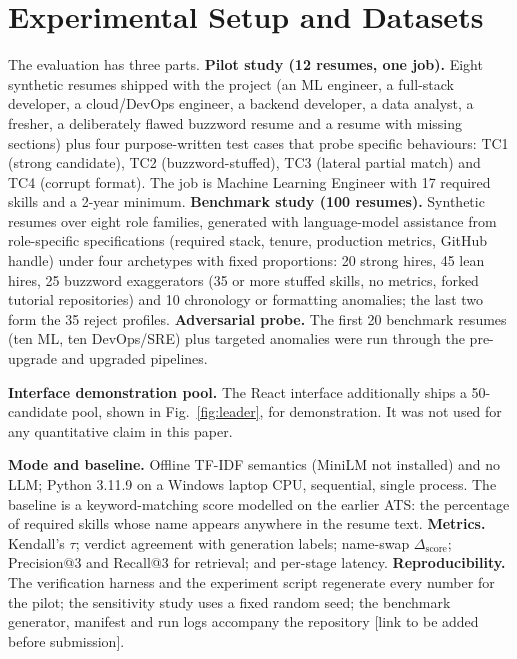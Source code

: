 \documentclass[conference]{IEEEtran}
\begin{document}
\section{Experimental Setup and Datasets}
\label{sec:exp}
The evaluation has three parts. \textbf{Pilot study (12 resumes, one job).} Eight synthetic resumes shipped with the project (an ML engineer, a full-stack developer, a cloud/DevOps engineer, a backend developer, a data analyst, a fresher, a deliberately flawed buzzword resume and a resume with missing sections) plus four purpose-written test cases that probe specific behaviours: TC1 (strong candidate), TC2 (buzzword-stuffed), TC3 (lateral partial match) and TC4 (corrupt format). The job is Machine Learning Engineer with 17 required skills and a 2-year minimum. \textbf{Benchmark study (100 resumes).} Synthetic resumes over eight role families, generated with language-model assistance from role-specific specifications (required stack, tenure, production metrics, GitHub handle) under four archetypes with fixed proportions: 20 strong hires, 45 lean hires, 25 buzzword exaggerators (35 or more stuffed skills, no metrics, forked tutorial repositories) and 10 chronology or formatting anomalies; the last two form the 35 reject profiles. \textbf{Adversarial probe.} The first 20 benchmark resumes (ten ML, ten DevOps/SRE) plus targeted anomalies were run through the pre-upgrade and upgraded pipelines.

\textbf{Interface demonstration pool.} The React interface additionally ships a 50-candidate pool, shown in Fig.~\ref{fig:leader}, for demonstration. It was not used for any quantitative claim in this paper.

\textbf{Mode and baseline.} Offline TF-IDF semantics (MiniLM not installed) and no LLM; Python 3.11.9 on a Windows laptop CPU, sequential, single process. The baseline is a keyword-matching score modelled on the earlier ATS: the percentage of required skills whose name appears anywhere in the resume text. \textbf{Metrics.} Kendall's $\tau$; verdict agreement with generation labels; name-swap $\Delta_{\mathrm{score}}$; Precision@3 and Recall@3 for retrieval; and per-stage latency. \textbf{Reproducibility.} The verification harness and the experiment script regenerate every number for the pilot; the sensitivity study uses a fixed random seed; the benchmark generator, manifest and run logs accompany the repository [link to be added before submission].

\end{document}
